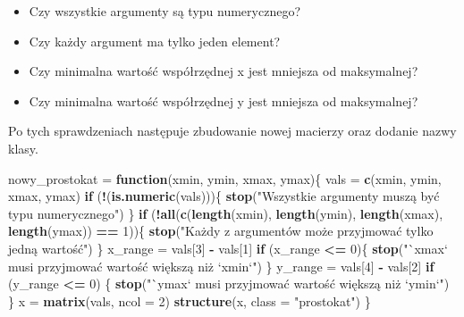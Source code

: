\documentclass[paper=6in:9in,pagesize=pdftex,headinclude=on,footinclude=on,10pt]{scrbook}
\newenvironment{Shaded}{\begin{snugshade}}{\end{snugshade}}
\newcommand{\ControlFlowTok}[1]{\textcolor[rgb]{0.13,0.29,0.53}{\textbf{#1}}}
\newcommand{\DataTypeTok}[1]{\textcolor[rgb]{0.13,0.29,0.53}{#1}}
\newcommand{\DecValTok}[1]{\textcolor[rgb]{0.00,0.00,0.81}{#1}}
\newcommand{\KeywordTok}[1]{\textcolor[rgb]{0.13,0.29,0.53}{\textbf{#1}}}
\newcommand{\NormalTok}[1]{#1}
\newcommand{\OperatorTok}[1]{\textcolor[rgb]{0.81,0.36,0.00}{\textbf{#1}}}
\newcommand{\StringTok}[1]{\textcolor[rgb]{0.31,0.60,0.02}{#1}}
\providecommand{\tightlist}{%
  \setlength{\itemsep}{0pt}\setlength{\parskip}{0pt}}
\begin{document}
\begin{itemize}
\tightlist
\item
  Czy wszystkie argumenty są typu numerycznego?
\item
  Czy każdy argument ma tylko jeden element?
\item
  Czy minimalna wartość współrzędnej x jest mniejsza od maksymalnej?
\item
  Czy minimalna wartość współrzędnej y jest mniejsza od maksymalnej?
\end{itemize}

Po tych sprawdzeniach następuje zbudowanie nowej macierzy oraz dodanie nazwy klasy.

\begin{Shaded}
\begin{Highlighting}[]
\NormalTok{nowy_prostokat =}\StringTok{ }\ControlFlowTok{function}\NormalTok{(xmin, ymin, xmax, ymax)\{}
\NormalTok{  vals =}\StringTok{ }\KeywordTok{c}\NormalTok{(xmin, ymin, xmax, ymax)}
  \ControlFlowTok{if}\NormalTok{ (}\OperatorTok{!}\NormalTok{(}\KeywordTok{is.numeric}\NormalTok{(vals)))\{}
    \KeywordTok{stop}\NormalTok{(}\StringTok{"Wszystkie argumenty muszą być typu numerycznego"}\NormalTok{)}
\NormalTok{  \}}
  \ControlFlowTok{if}\NormalTok{ (}\OperatorTok{!}\KeywordTok{all}\NormalTok{(}\KeywordTok{c}\NormalTok{(}\KeywordTok{length}\NormalTok{(xmin), }\KeywordTok{length}\NormalTok{(ymin), }\KeywordTok{length}\NormalTok{(xmax), }\KeywordTok{length}\NormalTok{(ymax)) }\OperatorTok{==}\StringTok{ }\DecValTok{1}\NormalTok{))\{}
    \KeywordTok{stop}\NormalTok{(}\StringTok{"Każdy z argumentów może przyjmować tylko jedną wartość"}\NormalTok{)}
\NormalTok{  \}}
\NormalTok{  x_range =}\StringTok{ }\NormalTok{vals[}\DecValTok{3}\NormalTok{] }\OperatorTok{-}\StringTok{ }\NormalTok{vals[}\DecValTok{1}\NormalTok{]}
  \ControlFlowTok{if}\NormalTok{ (x_range }\OperatorTok{<=}\StringTok{ }\DecValTok{0}\NormalTok{)\{}
    \KeywordTok{stop}\NormalTok{(}\StringTok{"`xmax` musi przyjmować wartość większą niż `xmin`"}\NormalTok{)}
\NormalTok{  \}}
\NormalTok{  y_range =}\StringTok{ }\NormalTok{vals[}\DecValTok{4}\NormalTok{] }\OperatorTok{-}\StringTok{ }\NormalTok{vals[}\DecValTok{2}\NormalTok{]}
  \ControlFlowTok{if}\NormalTok{ (y_range }\OperatorTok{<=}\StringTok{ }\DecValTok{0}\NormalTok{) \{}
    \KeywordTok{stop}\NormalTok{(}\StringTok{"`ymax` musi przyjmować wartość większą niż `ymin`"}\NormalTok{)}
\NormalTok{  \}}
\NormalTok{  x =}\StringTok{ }\KeywordTok{matrix}\NormalTok{(vals, }\DataTypeTok{ncol =} \DecValTok{2}\NormalTok{)}
  \KeywordTok{structure}\NormalTok{(x, }\DataTypeTok{class =} \StringTok{"prostokat"}\NormalTok{)}
\NormalTok{\}}
\end{Highlighting}
\end{Shaded}
\end{document}
